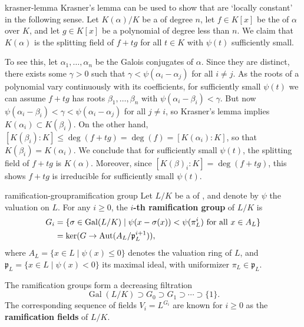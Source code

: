 \begin{example}{krasner-lemma}
    Krasner's lemma can be used to show that  are `locally constant' in the following sense. Let $K(\alpha) / K$ be a  of degree $n$, let $f \in K[x]$ be the  of $\alpha$ over $K$, and let $g \in K[x]$ be a polynomial of degree less than $n$. We claim that $K(\alpha)$ is the splitting field of $f + tg$ for all $t \in K$ with $\psi(t)$ sufficiently small.
    
    To see this, let $\alpha_1, \ldots, \alpha_n$ be the Galois conjugates of $\alpha$. Since they are distinct, there exists some $\gamma > 0$ such that $\gamma < \psi(\alpha_i - \alpha_j)$ for all $i \ne j$. As the roots of a polynomial vary continuously with its coefficients, for sufficiently small $\psi(t)$ we can assume $f + tg$ has roots $\beta_1, \ldots, \beta_n$ with $\psi(\alpha_i - \beta_i) < \gamma$. But now $\psi(\alpha_i - \beta_i) < \gamma < \psi(\alpha_i - \alpha_j)$ for all $j \ne i$, so Krasner's lemma implies $K(\alpha_i) \subset K(\beta_i)$. On the other hand, $[K(\beta_i) : K] \le \deg(f + tg) = \deg(f) = [K(\alpha_i) : K]$, so that $K(\beta_i) = K(\alpha_i)$. We conclude that for sufficiently small $\psi(t)$, the splitting field of $f + tg$ is $K(\alpha)$. Moreover, since $[K(\beta)_i : K] = \deg(f + tg)$, this shows $f + tg$ is irreducible for sufficiently small $\psi(t)$.
\end{example}

\begin{topic}{ramification-group}{ramification group}
    Let $L/K$ be a  of  , and denote by $\psi$ the valuation on $L$.
    For any $i \ge 0$, the \textbf{$i$-th ramification group} of $L/K$ is
    \[ \begin{aligned}
        G_i &= \{ \sigma \in \operatorname{Gal}(L/K) \mid \psi(x - \sigma(x)) < \psi(\pi_L^i) \textup{ for all } x \in A_L \} \\
        &= \ker(G \to \operatorname{Aut}(A_L/\mathfrak{p}_L^{i + 1})) ,
    \end{aligned} \]
    where $A_L = \{ x \in L \mid \psi(x) \le 0 \}$ denotes the valuation ring of $L$, and $\mathfrak{p}_L = \{ x \in L \mid \psi(x) < 0 \}$ its maximal ideal, with uniformizer $\pi_L \in \mathfrak{p}_L$.
    
    The ramification groups form a decreasing filtration
    \[ \operatorname{Gal}(L/K) \supset G_0 \supset G_1 \supset \cdots \supset \{ 1 \} . \]
    The corresponding sequence of fields $V_i = L^{G_i}$ are known for $i \ge 0$ as the \textbf{ramification fields} of $L/K$.
\end{topic}


